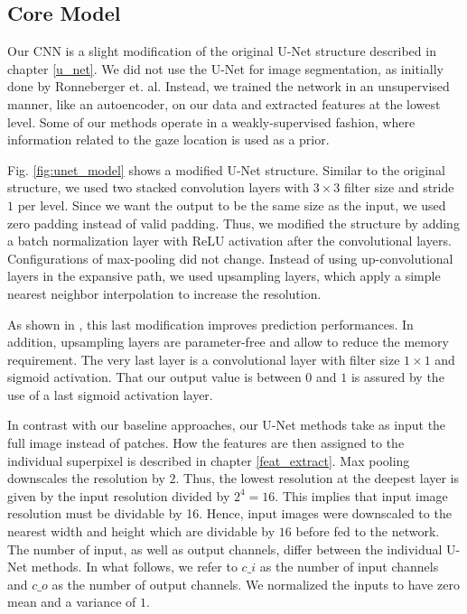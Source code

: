 \subsection{Core Model} \label{model}
Our CNN is a slight modification of the original U-Net structure described in chapter \ref{u_net}. We did not use the U-Net for image segmentation, as initially done by Ronneberger et. al. Instead, we trained the network in an unsupervised manner, like an autoencoder, on our data and extracted features at the lowest level. Some of our methods operate in a weakly-supervised fashion, where information related to the gaze location is used as a prior.

Fig. \ref{fig:unet_model} shows a modified U-Net structure. Similar to the original structure, we used two stacked convolution layers with $3 \times 3$ filter size and stride $1$ per level. Since we want the output to be the same size as the input, we used zero padding instead of valid padding. Thus, we modified the structure by adding a batch normalization layer with ReLU activation after the convolutional layers. Configurations of max-pooling did not change. Instead of using up-convolutional layers in the expansive path, we used upsampling layers, which apply a simple nearest neighbor interpolation to increase the resolution.

As shown in \cite{vorontsov17}, this last modification improves prediction performances.  In addition, upsampling layers are parameter-free and allow to reduce the memory requirement. The very last layer is a convolutional layer with filter size $1 \times 1$ and sigmoid activation. That our output value is between $0$ and $1$ is assured by the use of a last sigmoid activation layer.

In contrast with our baseline approaches, our U-Net methods take as input the full image instead of patches.
How the features are then assigned to the individual superpixel is described in chapter \ref{feat_extract}.
Max pooling downscales the resolution by $2$. Thus, the lowest resolution at the deepest layer is given by the input resolution divided by $2^4=16$. This implies that input image resolution must be dividable by 16. Hence, input images were downscaled to the nearest width and height which are dividable by $16$ before fed to the network. The number of input, as well as output channels, differ between the individual U-Net methods. In what follows, we refer to $c\_i$ as the number of input channels and $c\_o$ as the number of output channels. We normalized the inputs to have zero mean and a variance of $1$.

